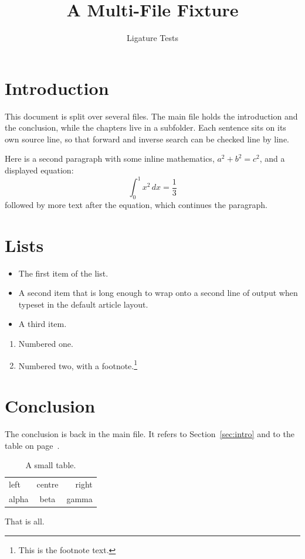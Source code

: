 \documentclass{article}
\title{A Multi-File Fixture}
\author{Ligature Tests}
\date{}
\begin{document}
\maketitle

\section{Introduction}
This document is split over several files.
The main file holds the introduction and the conclusion,
while the chapters live in a subfolder.
Each sentence sits on its own source line, so that forward and inverse
search can be checked line by line.

Here is a second paragraph with some inline mathematics, $a^2 + b^2 = c^2$,
and a displayed equation:
\begin{equation}
  \int_0^1 x^2 \, dx = \frac{1}{3}
\end{equation}
followed by more text after the equation, which continues the paragraph.



\section{Lists}
\begin{itemize}
  \item The first item of the list.
  \item A second item that is long enough to wrap onto a second line of output when typeset in the default article layout.
  \item A third item.
\end{itemize}
\begin{enumerate}
  \item Numbered one.
  \item Numbered two, with a footnote.\footnote{This is the footnote text.}
\end{enumerate}



\section{Conclusion}
The conclusion is back in the main file.
It refers to Section~\ref{sec:intro} and to the table on page~\pageref{tab:small}.
\begin{table}[h]
  \centering
  \begin{tabular}{lcr}
    left & centre & right \\
    alpha & beta & gamma \\
  \end{tabular}
  \caption{A small table.}\label{tab:small}
\end{table}
That is all.
\end{document}
